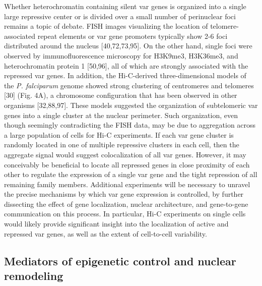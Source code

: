 Whether heterochromatin containing silent var genes is organized into a single
large repressive center or is divided over a small number of perinuclear foci
remains a topic of debate. FISH images visualizing the location of
telomere-associated repeat elements or var gene promoters typically show 2-6
foci distributed around the nucleus \citep{lopez-rubio:genome-wide,
freitas-junior:frequent, ralph:antigenic, voss:var} [40,72,73,95]. On the other hand, single
foci were observed by immunofluorescence microscopy for H3K9me3, H3K36me3, and
heterochromatin protein 1 \citep{ukaegbu:recruitment, dahan-pasternak:pfsec13} [50,96],
all of which are strongly associated with
the repressed var genes. In addition, the Hi-C-derived three-dimensional
models of the \textit{P. falciparum} genome showed strong clustering of centromeres and
telomeres \citep{ay:three-dimensional} [30] (Fig. 4A), a
chromosome configuration that has been observed in
other organisms \citep{duan:three-dimensional, tanizawa:mapping,
umbarger:three-dimensional} [32,88,97]. These models suggested the organization of
subtelomeric var genes into a single cluster at the nuclear perimeter. Such
organization, even though seemingly contradicting the FISH data, may be due to
aggregation across a large population of cells for Hi-C experiments. If each
var gene cluster is randomly located in one of multiple repressive clusters in
each cell, then the aggregate signal would suggest colocalization of all var
genes. However, it may conceivably be beneficial to locate all repressed genes
in close proximity of each other to regulate the expression of a single var
gene and the tight repression of all remaining family members. Additional
experiments will be necessary to unravel the precise mechanisms by which var
gene expression is controlled, by further dissecting the effect of gene
localization, nuclear architecture, and gene-to-gene communication on this
process. In particular, Hi-C experiments on single cells would likely provide
significant insight into the localization of active and repressed var genes,
as well as the extent of cell-to-cell variability. 

\subsection{Mediators of epigenetic control and nuclear remodeling}

